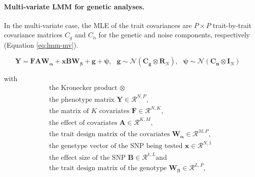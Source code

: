 \paragraph{Multi-variate LMM for genetic analyses.} In the multi-variate case, the MLE of the trait covariances are \(P\times P\) trait-by-trait covariance matrices \(C_g\) and \(C_n\) for the genetic and noise components, respectively (Equation \ref{eq:lmm-mv}).

\begin{equation}
\mathbf{Y} = \mathbf{F}\mathbf{A}\mathbf{W_\alpha} + \mathbf{x}\mathbf{B}\mathbf{W_\beta} + \mathbf{g}+\boldsymbol{\psi},\text{ }
\boldsymbol{g}\sim\mathcal{N}\left(\mathbf{C_g} \otimes \mathbf{R}_N\right),\text{ }
\boldsymbol{\psi}\sim\mathcal{N}\left(\mathbf{C_n} \otimes \mathbf{I}_N\right)
\label{eq:lmm-mv}
\end{equation}

with
\begin{align*} 
& \text{the Kronecker product } \otimes \\
& \text{the phenotype matrix } \mathbf{Y} \in \mathcal{R}^{N,P},\\
& \text{the matrix of $K$ covariates } \mathbf{F} \in \mathcal{R}^{N,K},\\
& \text{the effect of covariates } \boldsymbol{A} \in \mathcal{R}^{K,M},\\
& \text{the trait design matrix of the covariates } \mathbf{W_\alpha} \in \mathcal{R}^{M,P},\\
& \text{the genetype vector of the SNP being tested } \mathbf{x} \in \mathcal{R}^{N,1}\\
& \text{the effect size of the SNP } \boldsymbol{B} \in \mathcal{R}^{1, L} \text{and}\\
& \text{the trait design matrix of the genotype } \mathbf{W_\beta} \in \mathcal{R}^{L,P},\\
\end{align*} 


